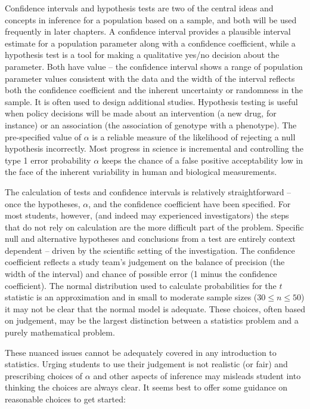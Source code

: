 \begin{spacing}{1.5}
Confidence intervals and hypothesis tests are two of the central ideas and concepts in inference for a population based on a sample, and both will be used frequently in later chapters.  A confidence interval provides a plausible interval estimate for a population parameter along with a confidence coefficient, while a hypothesis test is a tool for making a qualitative yes/no decision about the parameter. Both have value -- the confidence interval shows a range of population parameter values consistent with the data and the width of the interval reflects both the confidence coefficient and the inherent uncertainty or randomness in the sample. It is often used to design additional studies.  Hypothesis testing is useful when policy decisions will be made about an intervention (a new drug, for instance) or an association (the association of genotype with a phenotype).  The pre-specified value of $\alpha$ is a reliable measure of the likelihood of rejecting a null hypothesis incorrectly.  Most progress in science is incremental and controlling the type 1 error probability $\alpha$ keeps the chance of a false positive acceptability low in the face of the inherent variability in human and biological measurements.

The calculation of tests and confidence intervals is relatively straightforward -- once the hypotheses, $\alpha$, and the confidence coefficient have been specified.  For most students, however, (and indeed may experienced investigators) the steps that do not rely on calculation are the more difficult part of the problem.  Specific null and alternative hypotheses and conclusions from a test are entirely context dependent -- driven by the scientific setting of the investigation.  The confidence coefficient reflects a study team's judgement on the balance of precision (the width of the interval) and chance of possible error (1 minus the confidence coefficient). The normal distribution used to calculate probabilities for the $t$ statistic is an approximation and in small to moderate sample sizes ($30 \leq n \leq 50$) it may not be clear that the normal model is adequate.  These choices, often based on judgement, may be the largest distinction between a statistics problem and a purely mathematical problem.

These nuanced issues cannot be adequately covered in any introduction to statistics. Urging students to use their judgement is not realistic (or fair) and prescribing choices of $\alpha$ and other aspects of inference may misleads student into thinking the choices are always clear. It seems best to offer some guidance on reasonable choices to get started:


\end{spacing}
